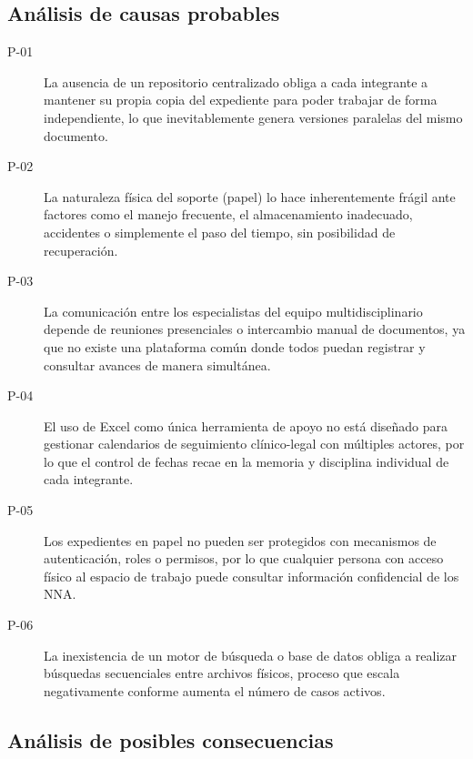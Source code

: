 \subsection{Análisis de causas probables}

\begin{description}
	\item[P-01] La ausencia de un repositorio centralizado obliga a cada integrante a 
	mantener su propia copia del expediente para poder trabajar de forma independiente, 
	lo que inevitablemente genera versiones paralelas del mismo documento.
	
	\item[P-02] La naturaleza física del soporte (papel) lo hace inherentemente frágil 
	ante factores como el manejo frecuente, el almacenamiento inadecuado, accidentes 
	o simplemente el paso del tiempo, sin posibilidad de recuperación.
	
	\item[P-03] La comunicación entre los especialistas del equipo multidisciplinario 
	depende de reuniones presenciales o intercambio manual de documentos, ya que no 
	existe una plataforma común donde todos puedan registrar y consultar avances 
	de manera simultánea.
	
	\item[P-04] El uso de Excel como única herramienta de apoyo no está diseñado para 
	gestionar calendarios de seguimiento clínico-legal con múltiples actores, por lo que 
	el control de fechas recae en la memoria y disciplina individual de cada integrante.
	
	\item[P-05] Los expedientes en papel no pueden ser protegidos con mecanismos de 
	autenticación, roles o permisos, por lo que cualquier persona con acceso físico al 
	espacio de trabajo puede consultar información confidencial de los NNA.
	
	\item[P-06] La inexistencia de un motor de búsqueda o base de datos obliga a 
	realizar búsquedas secuenciales entre archivos físicos, proceso que escala 
	negativamente conforme aumenta el número de casos activos.
\end{description}

\subsection{Análisis de posibles consecuencias}

